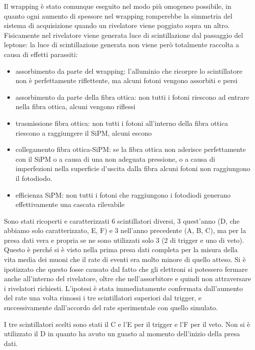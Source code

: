 Il wrapping è stato comunque eseguito nel modo più omogeneo possibile, in quanto ogni aumento di spessore nel wrapping romperebbe la simmetria del sistema di acquisizione quando un rivelatore viene poggiato sopra un altro.\\

Fisicamente nel rivelatore viene generata luce di scintillazione dal passaggio del leptone: la luce di scintillazione generata non viene però totalmente raccolta a causa di effetti parassiti:
\begin{itemize}
\item assorbimento da parte del wrapping: l'alluminio che ricorpre lo scintillatore non è perfettamente riflettente, ma alcuni fotoni vengono assorbiti e persi
\item assorbimento da parte della fibra ottica: non tutti i fotoni riescono ad entrare nella fibra ottica, alcuni vengono riflessi
\item trasmissione fibra ottica: non tutti i fotoni all'interno della fibra ottica riescono a raggiungere il SiPM, alcuni escono
\item collegamento fibra ottica-SiPM: se la fibra ottica non aderisce perfettamente con il SiPM o a causa di una non adeguata pressione, o a causa di imperfezioni nella superficie d'uscita dalla fibra alcuni fotoni non raggiungono il fotodiodo.
\item efficienza SiPM: non tutti i fotoni che raggiungono i fotodiodi generano effettivamente una cascata rilevabile
\end{itemize}


Sono stati ricoperti e caratterizzati 6 scintillatori diversi, 3 quest'anno (D, che abbiamo solo caratterizzato, E, F) e 3 nell'anno precedente (A, B, C), ma per la presa dati vera e propria se ne sono utilizzati solo 3 (2 di trigger e uno di veto). Questo \`e perch\'e si \`e visto nella prima presa dati completa per la misura della vita media dei muoni che il rate di eventi era molto minore di quello atteso. Si \`e ipotizzato che questo fosse causato dal fatto che gli elettroni si potessero fermare anche all'interno del rivelatore, oltre che nell'assorbitore e quindi non attraversare i  rivelatori richiesti. L'ipotesi \`e stata immediatamente confermata dall'aumento del rate una volta rimossi i tre scintillatori superiori dal trigger, e successivamente dall'accordo del rate sperimentale con quello simulato.

I tre scintillatori scelti sono stati il C e l'E per il trigger e l'F per il veto. Non si \`e utilizzato il D in quanto ha avuto un guasto al momento dell'inizio della presa dati.

